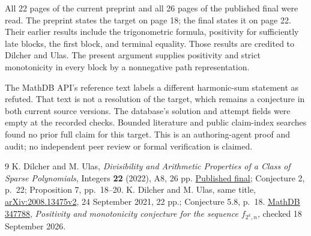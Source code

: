 \documentclass[11pt]{article}
\begin{document}
All 22 pages of the current preprint and all 26 pages of the published
final were read. The preprint states the target on page 18; the final
states it on page 22. Their earlier results include the trigonometric
formula, positivity for sufficiently late blocks, the first block,
and terminal equality. Those results are credited to Dilcher and Ulas.
The present argument supplies positivity and strict monotonicity in
every block by a nonnegative path representation.

The MathDB API's reference text labels a different harmonic-sum
statement as refuted. That text is not a resolution of the target,
which remains a conjecture in both current source versions. The
database's solution and attempt fields were empty at the recorded
checks. Bounded literature and public claim-index searches found no
prior full claim for this target. This is an authoring-agent proof and
audit; no independent peer review or formal verification is claimed.

\begin{thebibliography}{9}
K. Dilcher and M. Ulas,
\emph{Divisibility and Arithmetic Properties of a Class of Sparse Polynomials},
Integers \textbf{22} (2022), A8, 26 pp.
\href{https://math.colgate.edu/~integers/w8/w8.pdf}{Published final};
Conjecture 2, p.~22; Proposition 7, pp.~18--20.
K. Dilcher and M. Ulas, same title,
\href{https://arxiv.org/abs/2008.13475}{arXiv:2008.13475v2},
24 September 2021, 22 pp.; Conjecture 5.8, p.~18.
\href{https://mathdb.com/p/347788}{MathDB 347788},
\emph{Positivity and monotonicity conjecture for the sequence
$f_{2^k,n}$}, checked 18 September 2026.
\end{thebibliography}
\end{document}

